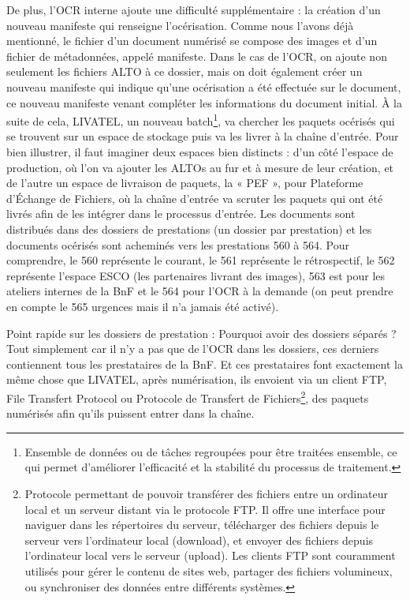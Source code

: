 \documentclass[a4paper,12pt,twoside]{book}
\begin{document}
	De plus, l'OCR interne ajoute une difficulté supplémentaire : la création d'un nouveau manifeste qui renseigne l'océrisation. Comme nous l'avons déjà mentionné, le fichier d'un document numérisé se compose des images et d'un fichier de métadonnées, appelé manifeste. Dans le cas de l'OCR, on ajoute non seulement les fichiers ALTO à ce dossier, mais on doit également créer un nouveau manifeste qui indique qu'une océrisation a été effectuée sur le document, ce nouveau manifeste venant compléter les informations du document initial. À la suite de cela, LIVATEL, un nouveau batch\footnote{ Ensemble de données ou de tâches regroupées pour être traitées ensemble, ce qui permet d’améliorer l’efficacité et la stabilité du processus de traitement.}, va chercher les paquets océrisés qui se trouvent sur un espace de stockage puis va les livrer à la chaîne d'entrée. Pour bien illustrer, il faut imaginer deux espaces bien distincts : d'un côté l'espace de production, où l'on va ajouter les ALTOs au fur et à mesure de leur création, et de l'autre un espace de livraison de paquets, la « PEF », pour Plateforme d’Échange de Fichiers, où la chaîne d'entrée va scruter les paquets qui ont été livrés afin de les intégrer dans le processus d'entrée. Les documents sont distribués dans des dossiers de prestations (un dossier par prestation) et les documents océrisés sont acheminés vers les prestations 560 à 564. Pour comprendre, le 560 représente le courant, le 561 représente le rétrospectif, le 562 représente l'espace ESCO (les partenaires livrant des images), 563 est pour les ateliers internes de la BnF et le 564 pour l'OCR à la demande (on peut prendre en compte le 565 urgences mais il n'a jamais été activé).
	
	Point rapide sur les dossiers de prestation : Pourquoi avoir des dossiers séparés ? Tout simplement car il n'y a pas que de l'OCR dans les dossiers,  ces derniers contiennent tous les prestataires de la BnF. Et ces prestataires font exactement la même chose que LIVATEL, après numérisation, ils envoient via un client FTP, File Transfert Protocol ou Protocole de Transfert de Fichiers\footnote{ Protocole permettant de pouvoir transférer des fichiers entre un ordinateur local et un serveur distant via le protocole FTP. Il offre une interface pour naviguer dans les répertoires du serveur, télécharger des fichiers depuis le serveur vers l'ordinateur local (download), et envoyer des fichiers depuis l'ordinateur local vers le serveur (upload). Les clients FTP sont couramment utilisés pour gérer le contenu de sites web, partager des fichiers volumineux, ou synchroniser des données entre différents systèmes.}, des paquets numérisés afin qu'ils puissent entrer dans la chaîne. 
	\\
	
\end{document}

